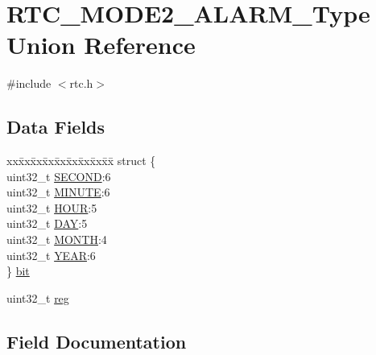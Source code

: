 \hypertarget{union_r_t_c___m_o_d_e2___a_l_a_r_m___type}{}\section{R\+T\+C\+\_\+\+M\+O\+D\+E2\+\_\+\+A\+L\+A\+R\+M\+\_\+\+Type Union Reference}
\label{union_r_t_c___m_o_d_e2___a_l_a_r_m___type}


{\ttfamily \#include $<$rtc.\+h$>$}

\subsection*{Data Fields}
\begin{DoxyCompactItemize}
\item 
\begin{tabbing}
xx\=xx\=xx\=xx\=xx\=xx\=xx\=xx\=xx\=\kill
struct \{\\
\>uint32\_t \mbox{\hyperlink{union_r_t_c___m_o_d_e2___a_l_a_r_m___type_a3c1af5a31c00cc624e89e3f26e47c069}{SECOND}}:6\\
\>uint32\_t \mbox{\hyperlink{union_r_t_c___m_o_d_e2___a_l_a_r_m___type_aab46c8de29168b7526efa8d64279084c}{MINUTE}}:6\\
\>uint32\_t \mbox{\hyperlink{union_r_t_c___m_o_d_e2___a_l_a_r_m___type_abd1a2f4aa3c1449d36773b8cc12be97f}{HOUR}}:5\\
\>uint32\_t \mbox{\hyperlink{union_r_t_c___m_o_d_e2___a_l_a_r_m___type_a9da2ace6ec7bed3e1e0ebc858221256f}{DAY}}:5\\
\>uint32\_t \mbox{\hyperlink{union_r_t_c___m_o_d_e2___a_l_a_r_m___type_ab5bf77b6909ffcc2b96155025e406700}{MONTH}}:4\\
\>uint32\_t \mbox{\hyperlink{union_r_t_c___m_o_d_e2___a_l_a_r_m___type_ada0131b43bb6b8e77fb3afbe4e25e4d4}{YEAR}}:6\\
\} \mbox{\hyperlink{union_r_t_c___m_o_d_e2___a_l_a_r_m___type_a363702af97a0200d9b7636d891b6d47d}{bit}}\\

\end{tabbing}\item 
uint32\+\_\+t \mbox{\hyperlink{union_r_t_c___m_o_d_e2___a_l_a_r_m___type_a6b91636401516a477989a336376d7b40}{reg}}
\end{DoxyCompactItemize}


\subsection{Field Documentation}
\mbox{\label{union_r_t_c___m_o_d_e2___a_l_a_r_m___type_a363702af97a0200d9b7636d891b6d47d}} 
